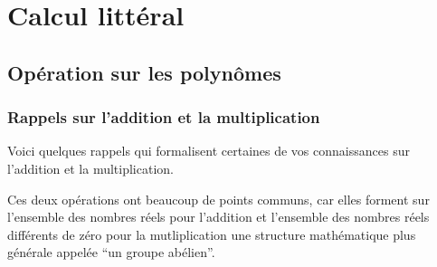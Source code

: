 \documentclass[a4paper,12pt]{report}
\begin{document}
\chapter{Calcul littéral}
\thispagestyle{fancy}
\section{Opération sur les polynômes}
\subsection{Rappels sur l'addition et la multiplication}
Voici quelques rappels qui formalisent certaines de vos connaissances sur l'addition et la multiplication. 

Ces deux opérations ont beaucoup de points communs, car elles forment sur l'ensemble des nombres réels pour l'addition et l'ensemble des nombres réels différents de zéro pour la mutliplication une structure mathématique plus générale appelée \enquote{un groupe abélien}.
\end{document}
